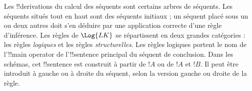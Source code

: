 \documentclass[../../../include/open-logic-section]{subfiles}
\begin{document}
Les !!{derivation}s du calcul des séquents sont certains arbres de
séquents. Les séquents situés tout en haut sont des séquents initiaux ;
un séquent placé sous un ou deux autres doit s'en déduire par une
application correcte d'une règle d'inférence. Les règles de
$\Log{LK}$ se répartissent en deux grandes catégories : les règles
\emph{logiques} et les règles \emph{structurelles}. Les règles
logiques portent le nom de l'!!{main operator} de l'!!{sentence}
principal du séquent de conclusion. Dans les schémas, cet !!{sentence}
est construit à partir de $!A$ ou de $!A$ et $!B$. Il peut être introduit
à gauche ou à droite du séquent, selon la version gauche ou droite
de la règle.
\end{document}
